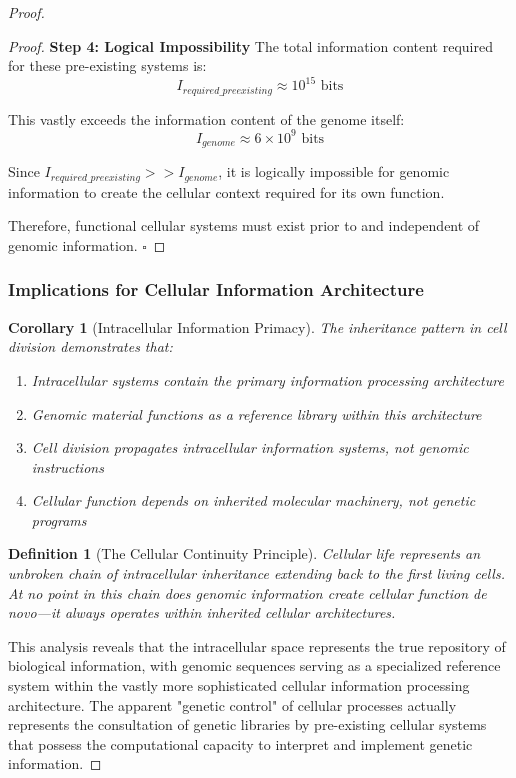 \documentclass[12pt,a4paper]{article}
\newtheorem{definition}[theorem]{Definition}
\newtheorem{corollary}[theorem]{Corollary}
\begin{document}
\begin{proof}
\begin{proof}
\textbf{Step 4: Logical Impossibility}
The total information content required for these pre-existing systems is:
\begin{equation}
I_{required\_preexisting} \approx 10^{15} \text{ bits}
\end{equation}

This vastly exceeds the information content of the genome itself:
\begin{equation}
I_{genome} \approx 6 \times 10^9 \text{ bits}
\end{equation}

Since $I_{required\_preexisting} >> I_{genome}$, it is logically impossible for genomic information to create the cellular context required for its own function.

Therefore, functional cellular systems must exist prior to and independent of genomic information. $\square$
\end{proof}

\subsubsection{Implications for Cellular Information Architecture}

\begin{corollary}[Intracellular Information Primacy]
The inheritance pattern in cell division demonstrates that:
\begin{enumerate}
\item Intracellular systems contain the primary information processing architecture
\item Genomic material functions as a reference library within this architecture
\item Cell division propagates intracellular information systems, not genomic instructions
\item Cellular function depends on inherited molecular machinery, not genetic programs
\end{enumerate}
\end{corollary}

\begin{definition}[The Cellular Continuity Principle]
Cellular life represents an unbroken chain of intracellular inheritance extending back to the first living cells. At no point in this chain does genomic information create cellular function de novo—it always operates within inherited cellular architectures.
\end{definition}

This analysis reveals that the intracellular space represents the true repository of biological information, with genomic sequences serving as a specialized reference system within the vastly more sophisticated cellular information processing architecture. The apparent "genetic control" of cellular processes actually represents the consultation of genetic libraries by pre-existing cellular systems that possess the computational capacity to interpret and implement genetic information.


\end{proof}
\end{document}

